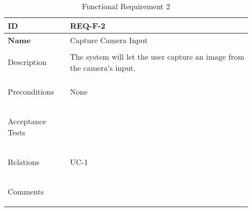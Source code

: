 \begin{table}[H]
    \begin{tabular}[t]{ | >{\bfseries}l | p{9.5cm} |}

    \hline
    ID
    &  REQ-F-2 \\ \hline

    Name
    & Capture Camera Input \\ \hline

    Description
    &  The system will let the user capture an image from the camera's input. \\ \hline

    Preconditions
    & None \\ \hline

    Acceptance Tests
    & \\ \hline

    Relations
    & UC-1 \\ \hline

    Comments
    &  \\ \hline

    \end{tabular}

    \caption{Functional Requirement 2}
    \label{fig:req_f_2}

\end{table}